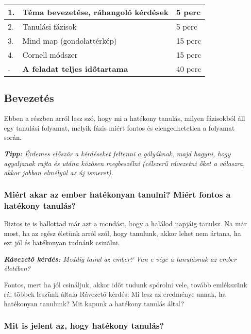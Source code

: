 \documentclass[../Main.tex]{subfiles}
\begin{document}
\begin{center}
    \begin{tabular}{| m{1.3 em} | m{} | m{} |}
    \hline
    1. & Téma bevezetése, ráhangoló kérdések & 5 perc \\
    \hline
    2. & Tanulási fázisok & 5 perc \\
    \hline
    3. & Mind map (gondolattérkép) & 15 perc \\
    \hline
    4. & Cornell módszer & 15 perc \\
    \hline
    - & \textbf{A feladat teljes időtartama} & 40 perc \\
    \hline
    \end{tabular}
\end{center}

\subsection{Bevezetés}

Ebben a részben arról lesz szó, hogy mi a hatékony tanulás, milyen fázisokból áll egy tanulási folyamat,
melyik fázis miért fontos és elengedhetetlen a folyamat során.

\textit{\textbf{Tipp:} Érdemes először a kérdéseket feltenni a gólyáknak, majd hagyni,
hogy agyaljanak rajta és utána közösen megbeszélni (célszerű rávezetni őket a válaszra, akkor jobban elmélyül az új ismeret).} \par

\subsubsection{Miért akar az ember hatékonyan tanulni? \newline Miért fontos a hatékony tanulás?}

Biztos te is hallottad már azt a mondást, hogy a halálod napjáig tanulsz.
Na már most, ha az egész életünk arról szól, hogy tanulunk, akkor lehet nem ártana,
ha ezt jól és hatékonyan tudnánk csinálni.

\textit{\textbf{Rávezető kérdés:} Meddig tanul az ember? Van e vége a tanulásnak az ember életében?}


Fontos, mert ha jól csináljuk, akkor időt tudunk spórolni vele, tovább emlékszünk rá, többek leszünk általa
Rávezető kérdés: Mi lesz az eredménye annak, ha hatékonyan tanulunk? Mit kapunk a hatékony tanulás által?

    
\subsubsection{Mit is jelent az, hogy hatékony tanulás?}
\end{document}

